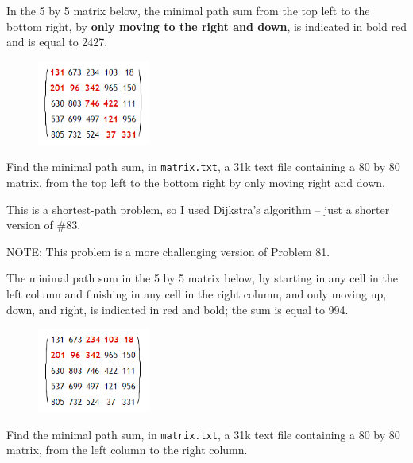 In the 5 by 5 matrix below, the minimal path sum from the top left to the bottom right, by \textbf{only moving to the right and down}, is indicated in bold red and is equal to 2427.
\vspace{-0.5cm}
\begin{center}
\begin{figure}[h]
\centering
\includegraphics[width = 0.33\textwidth]{./images/p_081.png}
\end{figure}
\end{center}
\vspace{-1.25cm}
Find the minimal path sum, in \verb"matrix.txt", a 31k text file containing a 80 by 80 matrix, from the top left to the bottom right by only moving right and down.

This is a shortest-path problem, so I used Dijkstra's algorithm -- just a shorter version of \#83.




\footnotesize
NOTE: This problem is a more challenging version of Problem 81.

\normalsize
The minimal path sum in the 5 by 5 matrix below, by starting in any cell in the left column and finishing in any cell in the right column, and only moving up, down, and right, is indicated in red and bold; the sum is equal to 994.
\vspace{-0.5cm}
\begin{center}
\begin{figure}[h]
\centering
\includegraphics[width = 0.33\textwidth]{./images/p_082.png}
\end{figure}
\end{center}
\vspace{-1.25cm}
Find the minimal path sum, in \verb"matrix.txt", a 31k text file containing a 80 by 80 matrix, from the left column to the right column.

